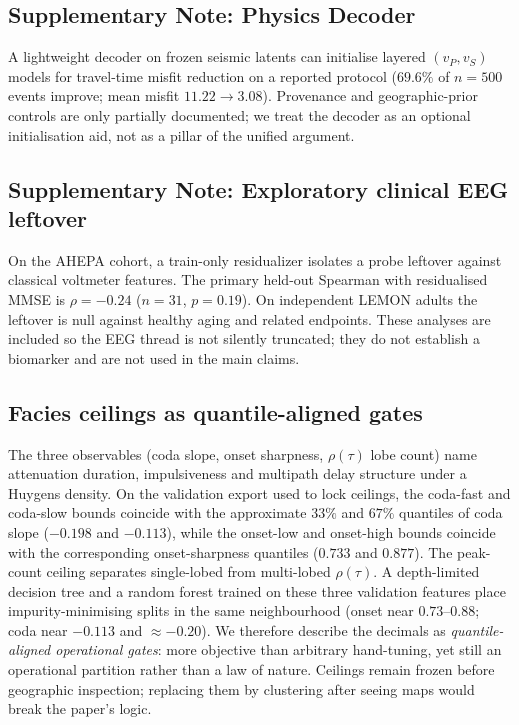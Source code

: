 \documentclass[twocolumn,10pt]{article}
\begin{document}
\subsection*{Supplementary Note: Physics Decoder}
\label{snote:decoder}
A lightweight decoder on frozen seismic latents can initialise layered
\((v_P,v_S)\) models for travel-time misfit reduction on a reported protocol
(\(69.6\%\) of \(n=500\) events improve; mean misfit \(11.22\rightarrow3.08\)).
Provenance and geographic-prior controls are only partially documented; we treat
the decoder as an optional initialisation aid, not as a pillar of the unified
argument.

\subsection*{Supplementary Note: Exploratory clinical EEG leftover}
\label{snote:clinical}
On the AHEPA cohort, a train-only residualizer isolates a probe leftover against
classical voltmeter features. The primary held-out Spearman with residualised
MMSE is \(\rho=-0.24\) (\(n=31\), \(p=0.19\)). On independent LEMON adults the
leftover is null against healthy aging and related endpoints. These analyses are
included so the EEG thread is not silently truncated; they do not establish a
biomarker and are not used in the main claims.

\subsection*{Facies ceilings as quantile-aligned gates}
\label{snote:ceilings}
The three observables (coda slope, onset sharpness, \(\rho(\tau)\) lobe count)
name attenuation duration, impulsiveness and multipath delay structure under a
Huygens density. On the validation export used to lock ceilings, the coda-fast
and coda-slow bounds coincide with the approximate \(33\%\) and \(67\%\)
quantiles of coda slope (\(-0.198\) and \(-0.113\)), while the onset-low and
onset-high bounds coincide with the corresponding onset-sharpness quantiles
(\(0.733\) and \(0.877\)). The peak-count ceiling separates single-lobed from
multi-lobed \(\rho(\tau)\). A depth-limited decision tree and a random forest
trained on these three validation features place impurity-minimising splits in
the same neighbourhood (onset near \(0.73\)--\(0.88\); coda near \(-0.113\) and
\(\approx-0.20\)). We therefore describe the decimals as
\emph{quantile-aligned operational gates}: more objective than arbitrary
hand-tuning, yet still an operational partition rather than a law of nature.
Ceilings remain frozen before geographic inspection; replacing them by
clustering after seeing maps would break the paper's logic.
\end{document}
